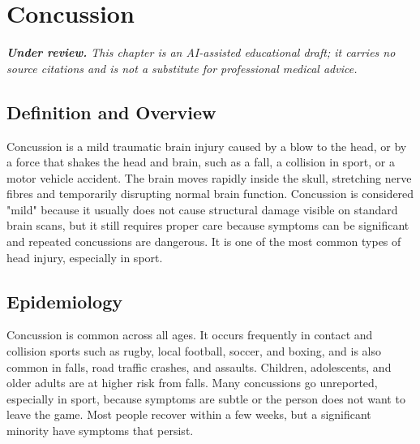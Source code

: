 \chapter{Concussion}

\medskip
\noindent\textit{\textbf{Under review.} This chapter is an AI-assisted educational draft; it carries no source citations and is not a substitute for professional medical advice.}

\section*{Definition and Overview}
Concussion is a mild traumatic brain injury caused by a blow to the head, or by a force that shakes the head and brain, such as a fall, a collision in sport, or a motor vehicle accident. The brain moves rapidly inside the skull, stretching nerve fibres and temporarily disrupting normal brain function. Concussion is considered "mild" because it usually does not cause structural damage visible on standard brain scans, but it still requires proper care because symptoms can be significant and repeated concussions are dangerous. It is one of the most common types of head injury, especially in sport.

\section*{Epidemiology}
Concussion is common across all ages. It occurs frequently in contact and collision sports such as rugby, local football, soccer, and boxing, and is also common in falls, road traffic crashes, and assaults. Children, adolescents, and older adults are at higher risk from falls. Many concussions go unreported, especially in sport, because symptoms are subtle or the person does not want to leave the game. Most people recover within a few weeks, but a significant minority have symptoms that persist.

